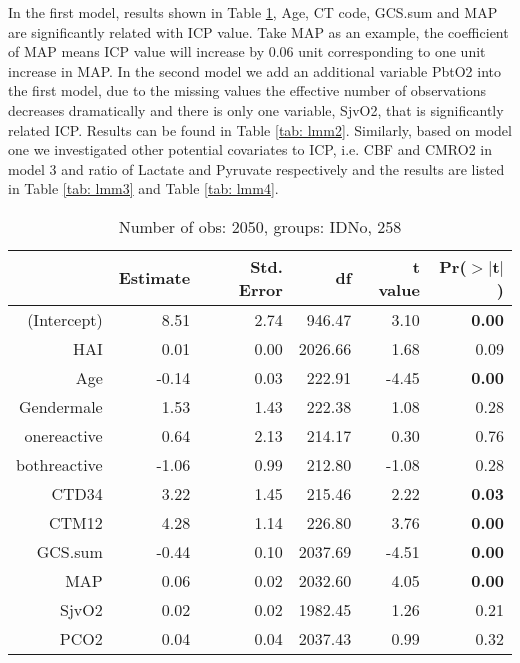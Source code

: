 \documentclass{article}
\begin{document}
In the first model, results shown in Table \ref{tab: lmm1}, Age, CT code, GCS.sum and MAP are significantly related with ICP value. Take MAP as an example, the coefficient of MAP means ICP value will increase by 0.06 unit corresponding to one unit increase in MAP. In the second model we add an additional variable PbtO2 into the first model, due to the missing values the effective number of observations decreases dramatically and there is only one variable, SjvO2, that is significantly related ICP. Results can be found in Table \ref{tab: lmm2}. Similarly, based on model one we investigated other potential covariates to ICP, i.e. CBF and CMRO2 in model 3 and ratio of Lactate and Pyruvate respectively and the results are listed in Table \ref{tab: lmm3} and Table \ref{tab: lmm4}. 

\begin{table}[H]
\centering
\begin{tabular}{rrrrrr}
  \hline
 & Estimate & Std. Error & df & t value & Pr($>$$|$t$|$) \\ 
  \hline
(Intercept) & 8.51 & 2.74 & 946.47 & 3.10 & {\bf 0.00} \\ 
  HAI & 0.01 & 0.00 & 2026.66 & 1.68 & 0.09 \\ 
  Age & -0.14 & 0.03 & 222.91 & -4.45 & {\bf 0.00} \\ 
  Gendermale & 1.53 & 1.43 & 222.38 & 1.08 & 0.28 \\ 
  onereactive & 0.64 & 2.13 & 214.17 & 0.30 & 0.76 \\ 
  bothreactive & -1.06 & 0.99 & 212.80 & -1.08 & 0.28 \\ 
  CTD34 & 3.22 & 1.45 & 215.46 & 2.22 & {\bf 0.03} \\ 
  CTM12 & 4.28 & 1.14 & 226.80 & 3.76 & {\bf 0.00} \\ 
  GCS.sum & -0.44 & 0.10 & 2037.69 & -4.51 & {\bf 0.00} \\ 
  MAP & 0.06 & 0.02 & 2032.60 & 4.05 & {\bf 0.00} \\ 
  SjvO2 & 0.02 & 0.02 & 1982.45 & 1.26 & 0.21 \\ 
  PCO2 & 0.04 & 0.04 & 2037.43 & 0.99 & 0.32 \\ 
   \hline
\end{tabular}
\caption{Number of obs: 2050, groups: IDNo, 258}
\label{tab: lmm1}
\end{table}
\end{document}

